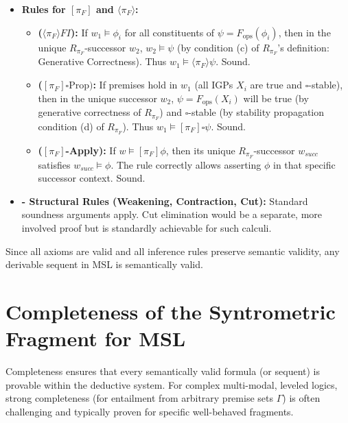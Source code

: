 \documentclass[
    12pt,              %
    a4paper,           %
    headings=normal,   %
    twoside=true,      %
    BCOR=8mm,          %
]{scrbook}
\newcommand{\BoxSyn}{\square}
\newcommand{\dynboxgen}[1]{[#1]}
\newcommand{\dyndiamondgen}[1]{\langle#1\rangle}
\newcommand{\fops}{F_{\text{ops}}}
\begin{document}
\begin{myproof}
\begin{itemize}
\begin{itemize}
\begin{itemize}
                \end{itemize}
            \item   \textbf{Rules for \(\dynboxgen{\pi_F}\) and \(\dyndiamondgen{\pi_F}\):}
                \begin{itemize}
                    \item   \textbf{(\(\dyndiamondgen{\pi_F} FI\)):} If \(w_1 \vDash \phi_i\) for all constituents of \(\psi = \fops(\phi_i)\), then in the unique \(R_{\pi_F}\)-successor \(w_2\), \(w_2 \vDash \psi\) (by condition (c) of \(R_{\pi_F}\)'s definition: Generative Correctness). Thus \(w_1 \vDash \dyndiamondgen{\pi_F}\psi\). Sound.
                    \item   \textbf{(\(\dynboxgen{\pi_F}\BoxSyn \text{Prop})\):} If premises hold in \(w_1\) (all IGPs \(X_i\) are true and \(\BoxSyn\)-stable), then in the unique successor \(w_2\), \(\psi = \fops(X_i)\) will be true (by generative correctness of \(R_{\pi_F}\)) and \(\BoxSyn\)-stable (by stability propagation condition (d) of \(R_{\pi_F}\)). Thus \(w_1 \vDash \dynboxgen{\pi_F}\BoxSyn\psi\). Sound.
                    \item   \textbf{(\(\dynboxgen{\pi_F}\)-Apply):} If \(w \vDash \dynboxgen{\pi_F}\phi\), then its unique \(R_{\pi_F}\)-successor \(w_{succ}\) satisfies \(w_{succ} \vDash \phi\). The rule correctly allows asserting \(\phi\) in that specific successor context. Sound.
                \end{itemize}
            \item   \textbf{- Structural Rules (Weakening, Contraction, Cut):} Standard soundness arguments apply. Cut elimination would be a separate, more involved proof but is standardly achievable for such calculi.
        \end{itemize}
\end{itemize}
Since all axioms are valid and all inference rules preserve semantic validity, any derivable sequent in MSL is semantically valid.
\end{myproof}

\section*{Completeness of the Syntrometric Fragment for MSL}

Completeness ensures that every semantically valid formula (or sequent) is provable within the deductive system. For complex multi-modal, leveled logics, strong completeness (for entailment from arbitrary premise sets \(\Gamma\)) is often challenging and typically proven for specific well-behaved fragments.
\end{document}
